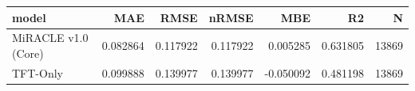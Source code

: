 \begin{tabular}{lrrrrrr}
\toprule
model & MAE & RMSE & nRMSE & MBE & R2 & N \\
\midrule
MiRACLE v1.0 (Core) & 0.082864 & 0.117922 & 0.117922 & 0.005285 & 0.631805 & 13869 \\
TFT-Only & 0.099888 & 0.139977 & 0.139977 & -0.050092 & 0.481198 & 13869 \\
\bottomrule
\end{tabular}
